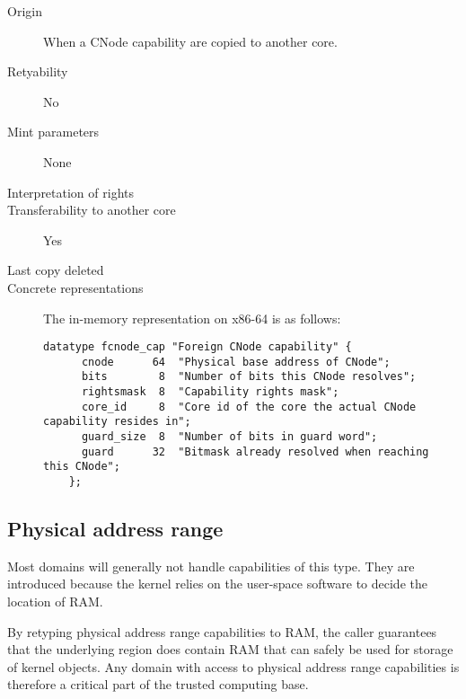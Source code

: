 \begin{description}
\item[Origin] When a CNode capability are copied to another core.

\item[Retyability] No

\item[Mint parameters] None
  
\item[Interpretation of rights] 
  
\item[Transferability to another core] Yes

\item[Last copy deleted] 
  
\item[Concrete representations] The in-memory representation on x86-64 is as follows:
  
  \begin{lstlisting}[language=Mackerel]
    datatype fcnode_cap "Foreign CNode capability" {
      cnode      64  "Physical base address of CNode";
      bits        8  "Number of bits this CNode resolves";
      rightsmask  8  "Capability rights mask";
      core_id     8  "Core id of the core the actual CNode capability resides in";
      guard_size  8  "Number of bits in guard word";
      guard      32  "Bitmask already resolved when reaching this CNode";
    };
  \end{lstlisting}
\end{description}


\subsection{Physical address range}

Most domains will generally not handle capabilities of this type.
They are introduced because the kernel relies on the user-space
software to decide the location of RAM.

By retyping physical address range capabilities to RAM, the caller
guarantees that the underlying region does contain RAM that can safely
be used for storage of kernel objects.  Any domain with access to
physical address range capabilities is therefore a critical part of
the trusted computing base.


